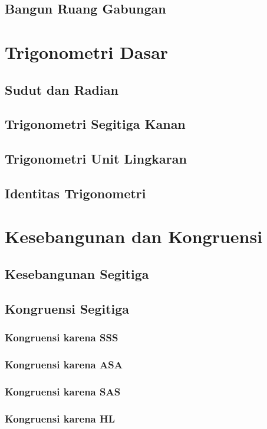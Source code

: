 \documentclass[12pt,a4paper,twoside,openany]{book}
\begin{document}
\section{Bangun Ruang Gabungan}

\chapter{Trigonometri Dasar}
\section{Sudut dan Radian}
\section{Trigonometri Segitiga Kanan}
\section{Trigonometri Unit Lingkaran}
\section{Identitas Trigonometri}

\chapter{Kesebangunan dan Kongruensi}
\section{Kesebangunan Segitiga}
\section{Kongruensi Segitiga}
	\subsection{Kongruensi karena SSS}
	\subsection{Kongruensi karena ASA}
	\subsection{Kongruensi karena SAS}
	\subsection{Kongruensi karena HL}
\end{document}
